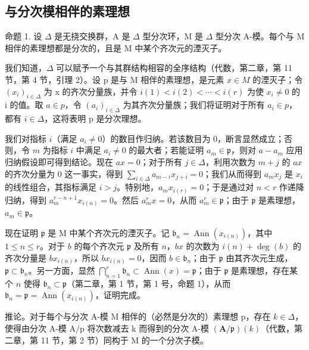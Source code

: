 \subsection{与分次模相伴的素理想}

命题 1. 设 \(\Delta\) 是无挠交换群，A 是 \(\Delta\) 型分次环，M 是 \(\Delta\) 型分次 A-模。每个与 M 相伴的素理想都是分次的，且是 M 中某个齐次元的湮灭子。

我们知道，\(\Delta\) 可以赋予一个与其群结构相容的全序结构（代数，第二章，第 11 节，第 4 节，引理 2）。设 p 是与 M 相伴的素理想，是元素 \(x \in M\) 的湮灭子；令 \((x_{i})_{i \in \Delta}\) 为 x 的齐次分量族，并令 \(i(1) < i(2) < \cdots < i(r)\) 为使 \(x_{i} \neq 0\) 的 i 的值。取 \(a \in p\)，令 \((a_{i})_{i \in \Delta}\) 为其齐次分量族；我们将证明对于所有 \(a_{i} \in p\)，都有 \(i \in \Delta\)，这将表明 p 是分次理想。

  我们对指标 \(i\)（满足 \(a_{i} \neq 0\)）的数目作归纳。若该数目为 0，断言显然成立；否则，令 \(m\) 为指标 \(i\) 中满足 \(a_{i} \neq 0\) 的最大者；若能证明 \(a_{m} \in \mathfrak{p}\)，则对 \(a - a_{m}\) 应用归纳假设即可得到结论。现在 \(ax = 0\)；对于所有 \(j \in \Delta\)，利用次数为 \(m + j\) 的 \(ax\) 的齐次分量为 0 这一事实，得到 \(\sum_{i \in \Delta} a_{m - i} x_{j + i} = 0\)；我们从而得到 \(a_{m} x_{j}\) 是 \(x_{i}\) 的线性组合，其指标满足 \(i > j\)。特别地，\(a_{m} x_{i(r)} = 0\)；于是通过对 \(n < r\) 作递降归纳，得到 \(a_{m}^{r - n + 1} x_{i(n)} = 0\)。然后 \(a_{m}^{r} x = 0\)，从而 \(a_{m}^{r} \in \mathfrak{p}\)；由于 \(\mathfrak{p}\) 是素理想，\(a_{m} \in \mathfrak{p}\)。

  现在证明 \(\mathfrak{p}\) 是 M 中某个齐次元的湮灭子。记 \(\mathfrak{b}_n = \operatorname{Ann}(x_{i(n)})\)，其中 \(1 \leqslant n \leqslant r\)。对于 \(b\) 的每个齐次元 \(\mathfrak{p}\) 及所有 \(n\)，\(bx\) 的次数为 \(i(n) + \deg(b)\) 的齐次分量是 \(bx_{i(n)}\)，所以 \(bx_{i(n)} = 0\)，因而 \(b \in \mathfrak{b}_n\)；由于 \(\mathfrak{p}\) 由其齐次元生成，\(\mathfrak{p} \subset \mathfrak{b}_n\)。另一方面，显然 \(\bigcap_{n=1}^{r} \mathfrak{b}_n \subset \operatorname{Ann}(x) = \mathfrak{p}\)；由于 \(\mathfrak{p}\) 是素理想，存在某个 \(n\) 使得 \(\mathfrak{b}_n \subset \mathfrak{p}\)（第二章，第 1 节，第 1 号，命题 1），从而 \(\mathfrak{b}_n = \mathfrak{p} = \operatorname{Ann}(x_{i(n)})\)，证明完成。

推论。对于每个与分次 A-模 M 相伴的（必然是分次的）素理想 p，存在 \(k \in \Delta\)，使得由分次 A-模 A/p 将次数减去 k 而得到的分次 A-模 \((\mathbf{A}/\mathfrak{p})(k)\)（代数，第二章，第 11 节，第 2 节）同构于 M 的一个分次子模。

